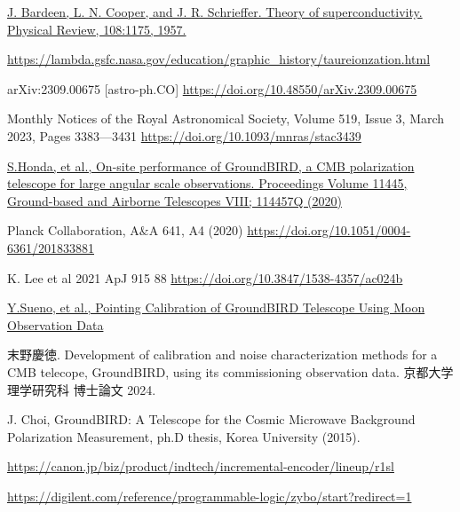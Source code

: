 \begin{thebibliography}{99}
\href{https://journals.aps.org/pr/abstract/10.1103/PhysRev.108.1175}
{J. Bardeen, L. N. Cooper, and J. R. Schrieffer. Theory of superconductivity. Physical Review, 108:1175, 1957.}

\href{https://lambda.gsfc.nasa.gov/education/graphic\_history/taureionzation.html}{https://lambda.gsfc.nasa.gov/education/graphic\_history/taureionzation.html}

arXiv:2309.00675 [astro-ph.CO]
\href{https://doi.org/10.48550/arXiv.2309.00675}{https://doi.org/10.48550/arXiv.2309.00675}

Monthly Notices of the Royal Astronomical Society, Volume 519, Issue 3, March 2023, Pages 3383—3431
\href{https://doi.org/10.1093/mnras/stac3439}{https://doi.org/10.1093/mnras/stac3439}

\href{https://www.spiedigitallibrary.org/conference-proceedings-of-spie/11445/114457Q/On-site-performance-of-GroundBIRD-a-CMB-polarization-telescope-for/10.1117/12.2560918.short}
{S.Honda, et al., On-site performance of GroundBIRD, a CMB polarization telescope for large angular scale observations. Proceedings Volume 11445, Ground-based and Airborne Telescopes VIII; 114457Q (2020)}

Planck Collaboration, A$\&$A 641, A4 (2020)
\href{https://doi.org/10.1051/0004-6361/201833881}{https://doi.org/10.1051/0004-6361/201833881}

K. Lee et al 2021 ApJ 915 88
\href{https://doi.org/10.3847/1538-4357/ac024b}{https://doi.org/10.3847/1538-4357/ac024b}

\href{https://ui.adsabs.harvard.edu/abs/2024PTEP.2024b3F01S/abstract}
{Y.Sueno, et al., Pointing Calibration of GroundBIRD Telescope Using Moon Observation Data}

末野慶徳. Development of calibration and noise characterization methods for a CMB telecope, GroundBIRD, using its commissioning observation data. 京都大学理学研究科 博士論文 2024.

J. Choi, GroundBIRD: A Telescope for the Cosmic Microwave Background Polarization Measurement, ph.D thesis, Korea University (2015).

\href{https://canon.jp/biz/product/indtech/incremental-encoder/lineup/r1sl}{https://canon.jp/biz/product/indtech/incremental-encoder/lineup/r1sl}

\href{https://digilent.com/reference/programmable-logic/zybo/start?redirect=1}{https://digilent.com/reference/programmable-logic/zybo/start?redirect=1}


\end{thebibliography}
